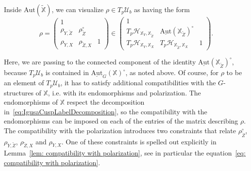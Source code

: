 \documentclass[letterpaper,11pt]{amsart}
\begin{document}


\noindent Inside $\mathrm{Aut}(\widetilde{\mathbb{X}})$, we can visualize $\rho\in T_p\mathcal{U}_b$ as having the form
\begin{equation}\label{eq:TpUb}
 \rho =   \begin{pmatrix}
        1& \ &\ \\
        \rho_{Y, \widetilde{Z}} & \rho^\circ_{\widetilde{Z}}& \ \\
        \rho_{Y,X} & \rho_{\widetilde{Z},X} & 1
    \end{pmatrix} \in 
    \begin{pmatrix}
        1 & \ & \ \\
        T_p\mathcal{H}_{\mathbb{X}_{Y}, \mathbb{X}_{\widetilde{Z}}} & 
        \underline{\mathrm{Aut}}(\mathbb{X}_{\widetilde{Z}})^\circ & \ \\
        T_p\mathcal{H}_{\mathbb{X}_Y, \mathbb{X}_X} & 
    T_p\mathcal{H}_{\mathbb{X}_{\widetilde{Z}},\mathbb{X}_{X}} & 1 
    \end{pmatrix}.
\end{equation}
\begin{remark}
Here, we are passing to the connected component of the identity $\underline{\mathrm{Aut}}(\mathbb{X}_{\widetilde{Z}})^\circ$, because $T_p\mathcal{U}_b$ is contained in $\underline{\mathrm{Aut}}_G(\mathbb{X})^\circ$, as noted above. Of course, for $\rho$ to be an element of $T_p\mathcal{U}_b$, it has to satisfy additional compatibilities with the $G$-structures of $\mathbb{X}$, i.e. with its endomorphisms and polarization. The endomorphisms of $\mathbb{X}$ respect the decomposition in~\eqref{eq:IgusaCuspLabelDecomposition}, so the compatibility with the endomorphisms can be imposed on each of the entries of the matrix describing $\rho$. The compatibility with the polarization introduces two constraints that relate $\rho^\circ_{\widetilde{Z}}$, $\rho_{Y,\widetilde{Z}}$, $\rho_{\widetilde{Z},X}$ and $\rho_{Y,X}$. One of these constraints is spelled out explicitly in Lemma~\ref{lem: compatibility with polarization}, see in particular the equation~\eqref{eq: compatibility with polarization}. 
\end{remark}
\end{document}

